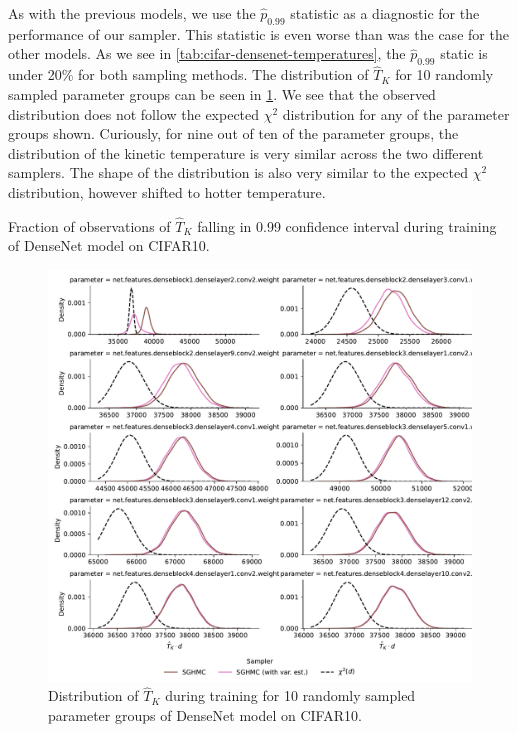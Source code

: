 As with the previous models, we use the $\hat p_{0.99}$ statistic as a diagnostic for the performance of our sampler.
This statistic is even worse than was the case for the other models.
As we see in \cref{tab:cifar-densenet-temperatures}, the $\hat p_{0.99}$ static is under 20\% for both sampling methods.
The distribution of $\hat{T}_K$ for 10 randomly sampled parameter groups can be seen in \cref{fig:cifar-densenet-temperatures}. 
We see that the observed distribution does not follow the expected $\chi^2$ distribution for any of the parameter groups shown. 
Curiously, for nine out of ten of the parameter groups, the distribution of the kinetic temperature is very similar across the two different samplers. 
The shape of the distribution is also very similar to the expected $\chi^2$ distribution, however shifted to hotter temperature.
\begin{table}[htbp]
    \centering
    
    \caption{Fraction of observations of $\hat{T}_K$ falling in 0.99 confidence interval during training of  DenseNet model on CIFAR10.}
    \label{tab:cifar-densenet-temperatures}
\end{table}
\begin{figure}[htbp]
    \centering
    \includegraphics[width=\linewidth]{Figures/cifar-densenet-temperatures.pdf}
    \caption{Distribution of $\hat{T}_K$ during training for 10 randomly sampled parameter groups of DenseNet model on CIFAR10.}
    \label{fig:cifar-densenet-temperatures}
\end{figure}